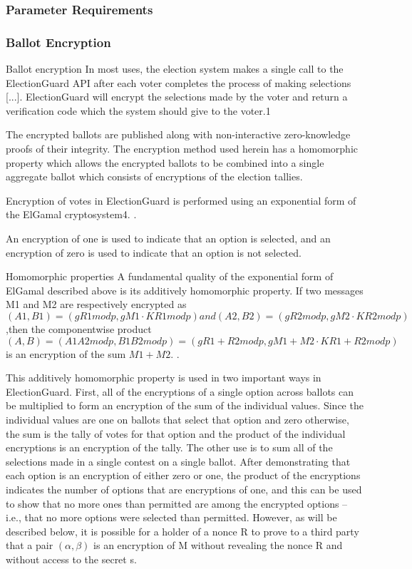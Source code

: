 \subsubsection{Parameter Requirements}


\subsubsection{Ballot Encryption}
Ballot encryption In most uses, the election system makes a single call to the ElectionGuard API after each voter
completes the process of making selections [...]. ElectionGuard will encrypt
the selections made by the voter and return a verification code which the system should give to the voter.1
\cite[3]{eg-spec}

The encrypted ballots are published along with non-interactive zero-knowledge proofs of their integrity. The encryption
method used herein has a homomorphic property which allows the encrypted ballots to be combined into a single aggregate
ballot which consists of encryptions of the election tallies.
\cite[3]{eg-spec}

Encryption of votes in ElectionGuard is performed using an exponential form of the ElGamal cryptosystem4.
\cite[4]{eg-spec}.

An encryption of one is used to indicate that an option is selected, and an encryption of zero is used to indicate that
an option is not selected.\cite[5]{eg-spec}

Homomorphic properties A fundamental quality of the exponential form of ElGamal described above is its additively
homomorphic property. If two messages M1 and M2 are respectively encrypted as $(A1, B1) = (gR1 mod p, gM1 \cdot KR1 mod p)
    and (A2, B2) = (gR2 mod p, gM2 \cdot KR2 mod p)$ ,then the componentwise product $(A, B) = (A1A2 mod p, B1B2 mod p) = (gR1+R2
    mod p, gM1+M2 \cdot KR1+R2 mod p)$ is an encryption of the sum $M1 + M2$.
\cite[5]{eg-spec}.

This additively homomorphic property is used in two important ways in ElectionGuard. First, all of the encryptions of a
single option across ballots can be multiplied to form an encryption of the sum of the individual values. Since the
individual values are one on ballots that select that option and zero otherwise, the sum is the tally of votes for that
option and the product of the individual encryptions is an encryption of the tally. The other use is to sum all of the
selections made in a single contest on a single ballot. After demonstrating that each option is an encryption of either
zero or one, the product of the encryptions indicates the number of options that are encryptions of one, and this can be
used to show that no more ones than permitted are among the encrypted options – i.e., that no more options were selected
than permitted. However, as will be described below, it is possible for a holder of a nonce R to prove to a third party
that a pair $(\alpha, \beta)$ is an encryption of M without revealing the nonce R and without access to the secret s.
\cite[5]{eg-spec}

